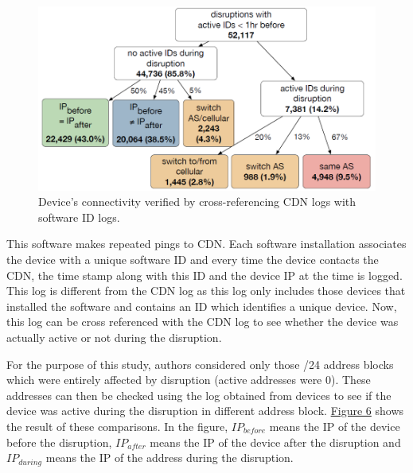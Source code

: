 \documentclass[11pt,twoside,a4paper]{article}
\begin{document}
\begin{figure}[h!] 
\centering
  \includegraphics[width=0.6\linewidth]{6.png}
  \caption{Device's connectivity verified by cross-referencing CDN logs with software ID logs.}
  \label{fig:DeviceID}
\end{figure}

This software makes repeated pings to CDN. Each software installation associates the device with a unique software ID and every time the device contacts the CDN, the time stamp along with this ID and the device IP at the time is logged. This log is different from the CDN log as this log only includes those devices that installed the software and contains an ID which identifies a unique device. Now, this log can be cross referenced with the CDN log to see whether the device was actually active or not during the disruption.

For the purpose of this study, authors considered only those /24 address blocks which were entirely affected by disruption (active addresses were 0). These addresses can then be checked using the log obtained from devices to see if the device was active during the disruption in different address block. \hyperref[fig:DeviceID]{Figure 6} shows the result of these comparisons. In the figure, $IP_{before}$ means the IP of the device before the disruption, $IP_{after}$ means the IP of the device after the disruption and $IP_{during}$ means the IP of the address during the disruption.
\end{document}
